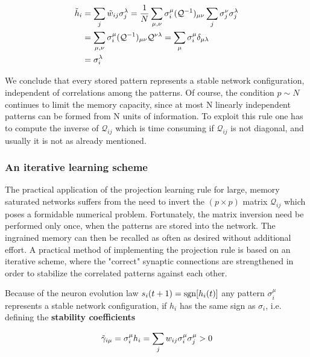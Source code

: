 \begin{equation}
\begin{split}
    \Tilde{h}_{i}&=\sum_{j}\Tilde{w}_{ij}\sigma^{\lambda}_{j}=\frac{1}{N}\sum_{\mu,\nu}\sigma^{\mu}_{i}(\mathcal{Q}^{-1})_{\mu \nu}\sum_{j}\sigma^{\nu}_{j}\sigma^{\lambda}_{j}\\    &=\sum_{\mu,\nu}\sigma^{\mu}_{i}(\mathcal{Q}^{-1})_{\mu \nu}\mathcal{Q}^{\nu \lambda}=\sum_{\mu}\sigma^{\mu}_{i}\delta_{\mu \lambda}\\
    &=\sigma^{\lambda}_{i}
\end{split}
\end{equation}

We conclude that every stored pattern represents a stable network configuration, independent of correlations among the patterns. Of course, the condition $p \sim N$ continues to limit the memory capacity, since at most N linearly independent patterns can be formed from N units of information.
To exploit this rule one has to compute the inverse of $\mathcal{Q}_{ij}$ which is time consuming if $\mathcal{Q}_{ij}$ is not diagonal, and usually it is not as already mentioned.

\subsubsection{An iterative learning scheme}\label{Sec:DOm}
The practical application of the projection learning rule for large, memory saturated networks suffers from the need to invert the $(p \times p)$ matrix $\mathcal{Q}_{ij}$ which poses a formidable numerical problem. Fortunately, the matrix inversion need be performed only once, when the patterns are stored into the network. The ingrained memory can then be recalled as often as desired without additional effort. A practical method of implementing the projection rule is based on an iterative scheme, where the "correct" synaptic connections are strengthened in order to stabilize the correlated patterns against each other.

Because of the neuron evolution law  $s_i(t + 1)=\operatorname{sgn}[h_{i}(t)]$ any pattern $\sigma_{i}^{\mu}$ represents a stable network configuration, if $h_i$ has the same sign as $\sigma_{i}$, i.e. defining the \textbf{stability coefficients}

\begin{equation}
    \Tilde{\gamma}_{i \mu}=\sigma_{i}^{\mu}h_{i}=\sum_{j}w_{ij}\sigma_{i}^{\mu}\sigma_{j}^{\mu}>0
    \label{eq:htilde1}
\end{equation}

